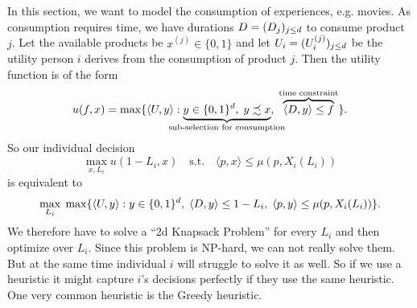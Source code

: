 In this section, we want to model the consumption of experiences, e.g. movies.
As consumption requires time, we have durations \(D=(D_j)_{j\le d}\) to
consume product \(j\). Let the available products be \(x^{(j)}\in \{0,1\}\) and
let \(U_i=(U_i^{(j)})_{j\le d}\) be the utility person \(i\) derives from
the consumption of product \(j\). Then the utility function is of the form
\[
	u(f, x) = \max\{
		\langle U, y\rangle : \underbrace{y\in \{0,1\}^\dims,\; y\precsim x}_{\mathclap{\text{sub-selection for consumption}}},\;
		\overbrace{\langle D, y\rangle \le f}^{\text{time constraint}}
	\}.
\]
So our individual decision
\[
	\max_{x, L_i}u(1-L_i, x) \quad\text{s.t.}\quad
	\langle p, x\rangle \le \mu(p, X_i(L_i))
\]
is equivalent to
\[
	\max_{L_i}\; \max\{
		\langle U, y\rangle: y\in \{0,1\}^d,\;
		\langle D, y \rangle \le 1-L_i,\;
		\langle p, y\rangle \le \mu(p, X_i(L_i))
	\}.
\]
We therefore have to solve a ``2d Knapsack Problem'' for every \(L_i\) and then
optimize over \(L_i\).
Since this problem is NP-hard, we can not really solve them. But at the same
time individual \(i\) will struggle to solve it as well. So if we use a
heuristic it might capture \(i\)'s decisions perfectly if they use the same
heuristic. One very common heuristic is the Greedy heuristic.
